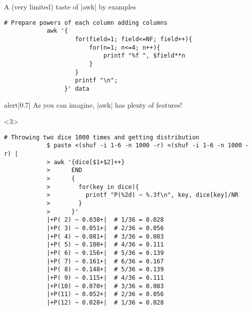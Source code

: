 \begin{frame}[fragile]{A (very limited) taste of \bash|awk| by examples}
\begin{onlyenv}
\begin{lstlisting}[style=MyBash, numbers=none, xleftmargin=3mm, xrightmargin=3mm, belowskip=-3mm]
            # Prepare powers of each column adding columns
            awk '{
                    for(field=1; field<=NF; field++){
                        for(n=1; n<=4; n++){
                            printf "%f ", $field**n
                        }
                    }
                    printf "\n";
                 }' data
        \end{lstlisting}
        \begin{varblock}{alert}[0.7\textwidth]{}
            \Large \alert{As you can imagine, \bash|awk| has plenty of features!}
        \end{varblock}
    \end{onlyenv}
    \begin{onlyenv}<3>
        \begin{lstlisting}[style=MyBash, numbers=none, xleftmargin=3mm, xrightmargin=3mm]
            # Throwing two dice 1000 times and getting distribution
            $ paste <(shuf -i 1-6 -n 1000 -r) <(shuf -i 1-6 -n 1000 -r) |
            > awk '{dice[$1+$2]++}
            >      END
            >      {
            >        for(key in dice){
            >          printf "P(%2d) ~ %.3f\n", key, dice[key]/NR
            >        }
            >      }'
            |+P( 2) ~ 0.038+|  # 1/36 = 0.028
            |+P( 3) ~ 0.051+|  # 2/36 = 0.056
            |+P( 4) ~ 0.081+|  # 3/36 = 0.083
            |+P( 5) ~ 0.100+|  # 4/36 = 0.111
            |+P( 6) ~ 0.156+|  # 5/36 = 0.139
            |+P( 7) ~ 0.161+|  # 6/36 = 0.167
            |+P( 8) ~ 0.148+|  # 5/36 = 0.139
            |+P( 9) ~ 0.115+|  # 4/36 = 0.111
            |+P(10) ~ 0.070+|  # 3/36 = 0.083
            |+P(11) ~ 0.052+|  # 2/36 = 0.056
            |+P(12) ~ 0.028+|  # 1/36 = 0.028
        \end{lstlisting}
    \end{onlyenv}
\end{frame}
